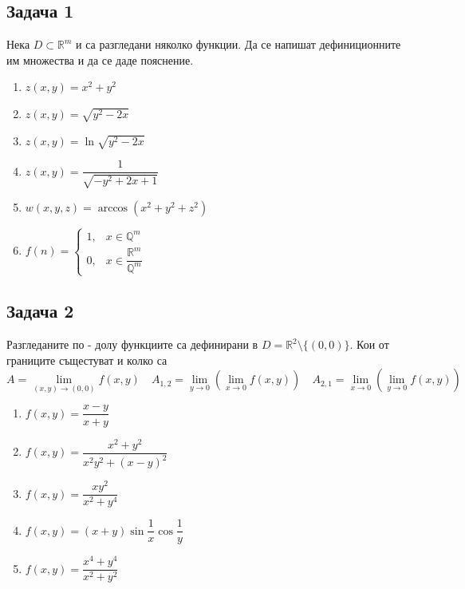 \documentclass[a4paper,fleqn,12pt]{article}
\theoremstyle{definition}
\begin{document}
\subsection*{Задача 1}
Нека $D \subset \mathbb{R}^m$ и са разгледани няколко функции. Да се напишат дефиниционните им множества и да се даде пояснение.  
\begin{enumerate}
\item $z(x, y) = x^2 + y^2 $
\item $z(x, y) = \sqrt{ y^2 - 2x }$
\item $z(x, y) = \ln \sqrt{ y^2 - 2x } $
\item $z(x, y) = \dfrac{1}{\sqrt{ -y^2 + 2x + 1}}$
\item $w(x, y, z) = \arccos(x^2 + y^2 + z^2)$
\item $f(n) = 
\begin{cases}
1, & x\in \mathbb{Q}^m \\
0, & x \in \dfrac{\mathbb{R}^m}{\mathbb{Q}^m}
\end{cases}
$
\end{enumerate}

\subsection*{Задача 2}

Разгледаните по - долу функциите са дефинирани в $D = \mathbb{R}^2 \setminus \{ (0,0) \}$. Кои от границите същестуват и колко са
$$
A = \lim\limits_{(x,y) \to (0,0)} f(x,y) \quad
A_{1,2} = \lim\limits_{y \to 0} \left( \lim\limits_{x \to 0} f(x,y) \right) \quad
A_{2,1} = \lim\limits_{x \to 0} \left( \lim\limits_{y \to 0} f(x,y) \right) \quad
$$

\begin{enumerate}
\item $f(x,y) = \dfrac{x-y}{x+y}$
\item $f(x,y) = \dfrac{x^2 + y^2}{x^2y^2 + (x - y)^2}$
\item $f(x,y) = \dfrac{xy^2}{x^2+y^4}$
\item $f(x,y) = (x+y) \sin{\dfrac{1}{x}} \cos{\dfrac{1}{y}}$
\item $f(x,y) = \dfrac{x^4 + y^4}{x^2 + y^2}$
\end{enumerate}
\end{document}
